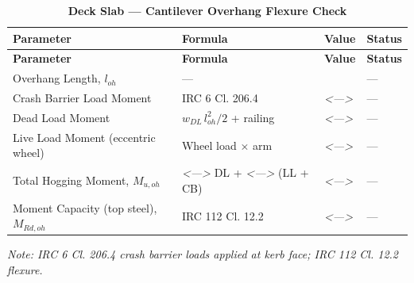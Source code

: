 \documentclass[12pt,a4paper]{report}
\numberwithin{table}{chapter}
\numberwithin{figure}{chapter}
\newcommand{\ReportTableGap}{\vspace{1em}}
\newcommand{\placeholder}[1]{\textit{\textless #1\textgreater}}
\begin{document}
\ReportTableGap
\begin{longtable}{|L{5.5cm}|C{3.5cm}|>{\centering\arraybackslash}p{4.5cm}|C{2cm}|}
\caption{\textbf{Deck Slab --- Cantilever Overhang Flexure Check}}\\
\hline
\textbf{Parameter} & \textbf{Formula} & \textbf{Value} & \textbf{Status} \\[6pt]
\hline
\endfirsthead
\hline
\textbf{Parameter} & \textbf{Formula} & \textbf{Value} & \textbf{Status} \\[6pt]
\hline
\endhead

Overhang Length, $l_{oh}$ & --- &  & --- \\[6pt]
\hline
Crash Barrier Load Moment & IRC 6 Cl. 206.4 & \placeholder{---} & --- \\[6pt]
\hline
Dead Load Moment & $w_{DL}\,l_{oh}^2/2$ + railing & \placeholder{---} & --- \\[6pt]
\hline
Live Load Moment (eccentric wheel) & Wheel load $\times$ arm & \placeholder{---} & --- \\[6pt]
\hline
Total Hogging Moment, $M_{u,oh}$ & \placeholder{---} DL + \placeholder{---} (LL + CB) & \placeholder{---} & --- \\[6pt]
\hline
Moment Capacity (top steel), $M_{Rd,oh}$ & IRC 112 Cl. 12.2 & \placeholder{---} & --- \\[6pt]
\hline
\end{longtable}
\noindent\textit{Note: IRC 6 Cl. 206.4 crash barrier loads applied at kerb face; IRC 112 Cl. 12.2 flexure.}
\end{document}
